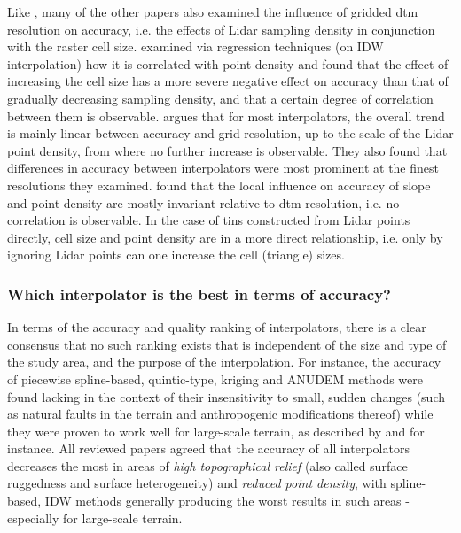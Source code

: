 Like \cite{aguilar_etal_2010}, many of the other papers also examined the influence of gridded \ac{dtm} resolution on accuracy, i.e. the effects of Lidar sampling density in conjunction with the raster cell size. \cite{chow_hodgson_2009} examined via regression techniques (on IDW interpolation) how it is correlated with point density and found that the effect of increasing the cell size has a more severe negative effect on accuracy than that of gradually decreasing sampling density, and that a certain degree of correlation between them is observable. \cite{guo_etal_2010} argues that for most interpolators, the overall trend is mainly linear between accuracy and grid resolution, up to the scale of the Lidar point density, from where no further increase is observable. They also found that differences in accuracy between interpolators were most prominent at the finest resolutions they examined. \cite{bater_coops_2009} found that the local influence on accuracy of slope and point density are mostly invariant relative to \ac{dtm} resolution, i.e. no correlation is observable. In the case of \ac{tin}s constructed from Lidar points directly, cell size and point density are in a more direct relationship, i.e. only by ignoring Lidar points can one increase the cell (triangle) sizes.

\subsubsection{Which interpolator is the best in terms of accuracy?}

In terms of the accuracy and quality ranking of interpolators, there is a clear consensus that no such ranking exists that is independent of the size and type of the study area, and the purpose of the interpolation. For instance, the accuracy of piecewise spline-based, quintic-type, kriging and ANUDEM methods were found lacking in the context of their insensitivity to small, sudden changes (such as natural faults in the terrain and anthropogenic modifications thereof) while they were proven to work well for large-scale terrain, as described by \cite{bater_coops_2009} and \cite{guo_etal_2010} for instance. All reviewed papers agreed that the accuracy of all interpolators decreases the most in areas of \textit{high topographical relief} (also called surface ruggedness and surface heterogeneity) and \textit{reduced point density}, with spline-based, IDW methods generally producing the worst results in such areas - especially for large-scale terrain.


